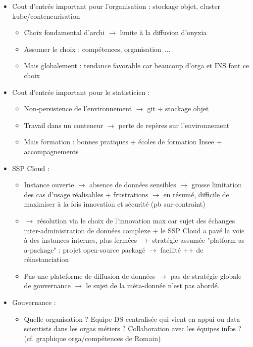 \begin{itemize}
    \item Cout d'entrée important pour l'organisation : stockage objet, cluster kube/conteneurisation
    \begin{itemize}
        \item Choix fondamental d'archi $\rightarrow$ limite à la diffusion d'onyxia
        \item Assumer le choix : compétences, organisation~...
        \item Mais globalement : tendance favorable car beaucoup d'orga et INS font ce choix
    \end{itemize}
    \item Cout d'entrée important pour le statisticien :
    \begin{itemize}
        \item Non-persistence de l'environnement $\rightarrow$ git + stockage objet
        \item Travail dans un conteneur $\rightarrow$ perte de repères sur l'environnement
        \item Mais formation : bonnes pratiques + écoles de formation Insee + accompagnements
    \end{itemize}
    \item SSP Cloud :
    \begin{itemize}
        \item Instance ouverte $\rightarrow$ absence de données sensibles $\rightarrow$ grosse limitation des cas d'usage réalisables + frustrations $\rightarrow$ en résumé, difficile de maximiser à la fois innovation et sécurité (pb sur-contraint)
        \item $\rightarrow$ résolution via le choix de l'innovation max car sujet des échanges inter-administration de données complexe + le SSP Cloud a pavé la voie à des instances internes, plus fermées $\rightarrow$ stratégie assumée "platform-as-a-package" : projet open-source packagé $\rightarrow$ facilité ++ de réinstanciation
        \item Pas une plateforme de diffusion de données $\rightarrow$ pas de stratégie globale de gouvernance $\rightarrow$ le sujet de la méta-donnée n'est pas abordé.
    \end{itemize}
    \item Gouvernance :
    \begin{itemize}
        \item Quelle organisation ? Equipe DS centralisée qui vient en appui ou data scientists dans les orgas métiers ? Collaboration avec les équipes infos ? (cf. graphique orga/compétences de Romain)
    \end{itemize}
\end{itemize}



